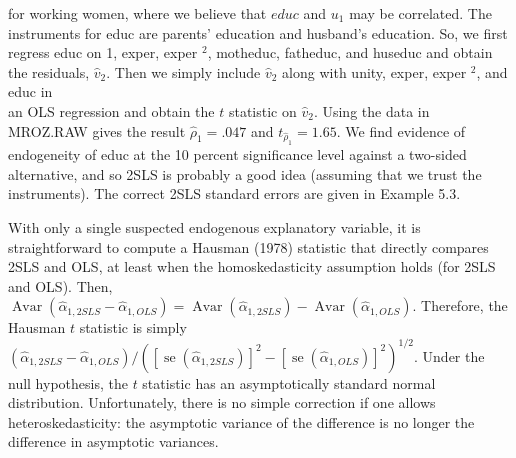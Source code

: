 \documentclass[10pt]{article}
\begin{document}
for working women, where we believe that $e d u c$ and $u_{1}$ may be correlated. The instruments for educ are parents' education and husband's education. So, we first regress educ on 1, exper, exper ${ }^{2}$, motheduc, fatheduc, and huseduc and obtain the residuals, $\hat{v}_{2}$. Then we simply include $\hat{v}_{2}$ along with unity, exper, exper ${ }^{2}$, and educ in\\
an OLS regression and obtain the $t$ statistic on $\hat{v}_{2}$. Using the data in MROZ.RAW gives the result $\hat{\rho}_{1}=.047$ and $t_{\hat{\rho}_{1}}=1.65$. We find evidence of endogeneity of educ at the 10 percent significance level against a two-sided alternative, and so 2SLS is probably a good idea (assuming that we trust the instruments). The correct 2SLS standard errors are given in Example 5.3.

With only a single suspected endogenous explanatory variable, it is straightforward to compute a Hausman (1978) statistic that directly compares 2SLS and OLS, at least when the homoskedasticity assumption holds (for 2SLS and OLS). Then, $\operatorname{Avar}\left(\hat{\alpha}_{1,2 S L S}-\hat{\alpha}_{1, O L S}\right)=\operatorname{Avar}\left(\hat{\alpha}_{1,2 S L S}\right)-\operatorname{Avar}\left(\hat{\alpha}_{1, O L S}\right)$. Therefore, the Hausman $t$ statistic is simply $\left(\hat{\alpha}_{1,2 S L S}-\hat{\alpha}_{1, O L S}\right) /\left(\left[\operatorname{se}\left(\hat{\alpha}_{1,2 S L S}\right)\right]^{2}-\left[\operatorname{se}\left(\hat{\alpha}_{1, O L S}\right)\right]^{2}\right)^{1 / 2}$. Under the null hypothesis, the $t$ statistic has an asymptotically standard normal distribution. Unfortunately, there is no simple correction if one allows heteroskedasticity: the asymptotic variance of the difference is no longer the difference in asymptotic variances.
\end{document}
